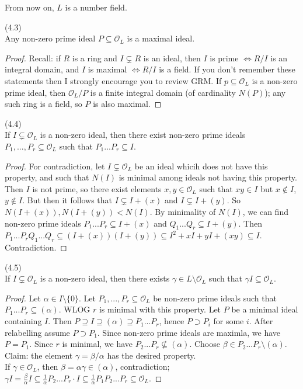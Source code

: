 \documentclass[a4paper]{article}
\begin{document}
From now on, $L$ is a number field.

\begin{lemma} (4.3)\\
Any non-zero prime ideal $P \subseteq \mathcal{O}_L$ is a maximal ideal.
\begin{proof}
Recall: if $R$ is a ring and $I \subsetneq R$ is an ideal, then $I$ is prime $\iff R/I$ is an integral domain, and $I$ is maximal $\iff R/I$ is a field. If you don't remember these statements then I strongly encourage you to review GRM. If $p \subseteq \mathcal{O}_L$ is a non-zero prime ideal, then $\mathcal{O}_L/P$ is a finite integral domain (of cardinality $N(P)$); any such ring is a field, so $P$ is also maximal.
\end{proof}
\end{lemma}

\begin{lemma} (4.4)\\
If $I \subsetneq \mathcal{O}_L$ is a non-zero ideal, then there exist non-zero prime ideals $P_1,...,P_r \subseteq \mathcal{O}_L$ such that $P_1...P_r \subseteq I$.
\begin{proof}
For contradiction, let $I \subsetneq \mathcal{O}_L$ be an ideal whicih does not have this property, and such that $N(I)$ is minimal among ideals not having this property. Then $I$ is not prime, so there exist elements $x,y \in \mathcal{O}_L$ such that $xy \in I$ but $x \not\in I$, $y \not\in I$. But then it follows that $I \subsetneq I+(x)$ and $I \subsetneq I+(y)$. So $N(I+(x)), N(I+(y)) < N(I)$. By minimality of $N(I)$, we can find non-zero prime ideals $P_1...P_r \subseteq I+(x)$ and $Q_1...Q_r \subseteq I+(y)$. Then $P_1 ... P_rQ_1...Q_r \subseteq (I+(x))(I+(y)) \subseteq I^2 +xI+yI+(xy) \subseteq I$. Contradiction.
\end{proof}
\end{lemma}

\begin{lemma} (4.5)\\
If $I \subsetneq \mathcal{O}_L$ is a non-zero ideal, then there exists $\gamma \in L\setminus \mathcal{O}_L$ such that $\gamma I \subseteq \mathcal{O}_L$.
\begin{proof}
Let $\alpha \in I \setminus \{0\}$. Let $P_1,...,P_r \subseteq \mathcal{O}_L$ be non-zero prime ideals such that $P_1...P_r \subseteq (\alpha)$. WLOG $r$ is minimal with this property. Let $P$ be a minimal ideal containing $I$. Then $P \supseteq I \supseteq (\alpha) \supseteq P_1...P_r$, hence $P \supset P_i$ for some $i$. After relabelling assume $P \supset P_1$. Since non-zero prime ideals are maximla, we have $P=P_1$. Since $r$ is minimal, we have $P_2...P_r \not\subseteq(\alpha)$. Choose $\beta \in P_2...P_r \setminus (\alpha)$.\\
Claim: the element $\gamma = \beta/\alpha$ has the desired property.\\
If $\gamma \in \mathcal{O}_L$, then $\beta = \alpha\gamma \in (\alpha)$, contradiction;\\
$\gamma I = \frac{\beta}{\alpha} I \subseteq \frac{1}{\alpha} P_2...P_r \cdot I \subseteq \frac{1}{\alpha} P_1P_2...P_r \subseteq \mathcal{O}_L$.
\end{proof}
\end{lemma}
\end{document}

